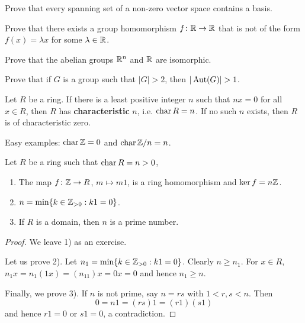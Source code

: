 \begin{exercise}
    Prove that every spanning set of a non-zero vector space
    contains a basis. 
\end{exercise}

\begin{exercise}
\label{xca:fx=cx}
    Prove that there exists a group homomorphism $f\colon\mathbb{R}\to\mathbb{R}$ that 
    is not of the form $f(x)=\lambda x$ for some $\lambda\in\mathbb{R}$. 
\end{exercise}


\begin{exercise}
\label{xca:Rn=R}
    Prove that the abelian groups $\mathbb{R}^n$ and $\mathbb{R}$ are isomorphic.
\end{exercise}

\begin{exercise}
\label{xca:aut}
    Prove that if $G$ is a group such that $|G|>2$, then $|\Aut(G)|>1$.
\end{exercise}


\begin{definition}
Let $R$ be a ring. If there is a least positive integer $n$ such that 
$nx=0$ for all $x\in R$, then $R$ has \textbf{characteristic} $n$, i.e. $\operatorname{char} R=n$. If no such $n$ exists, 
then $R$ is of characteristic zero. 
\end{definition}

Easy examples: $\operatorname{char}\mathbb{Z}=0$ and $\operatorname{char}\mathbb{Z}/n=n$.

\begin{proposition}
    Let $R$ be a ring such that $\operatorname{char} R=n>0$,
    \begin{enumerate}
        \item The map $f\colon \mathbb{Z}\to R$, $m\mapsto m1$, is a ring homomorphism and $\ker f=n\mathbb{Z}$.  
        \item $n=\min\{k\in\mathbb{Z}_{>0}:k1=0\}$.
        \item If $R$ is a domain, then $n$ is a prime number.
    \end{enumerate}
\end{proposition}

\begin{proof}
    We leave 1) as an exercise. 
    
    Let us prove 2). Let $n_1=\min\{k\in\mathbb{Z}_{>0}:k1=0\}$. Clearly 
    $n\geq n_1$. For $x\in R$,
    $n_1x=n_1(1x)=(n_11)x=0x=0$ 
    and hence $n_1\geq n$. 
    
    Finally, we prove 3). If $n$ is not prime, say
    $n=rs$ with $1<r,s<n$. Then 
    \[
    0=n1=(rs)1=(r1)(s1)
    \]
    and hence $r1=0$ or $s1=0$, a contradiction. 
\end{proof}

